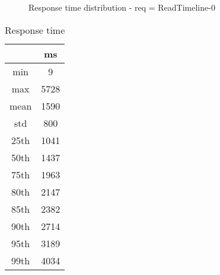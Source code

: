 \begin{minipage}{0.75\linewidth}
\begin{figure}[h]
\begin{adjustbox}{max width=1.0\linewidth, keepaspectratio}
  \end{adjustbox}
  \caption{Response time distribution - req = ReadTimeline-0}
\end{figure}
\end{minipage}\hfill\begin{minipage}{0.18\linewidth}
\begin{table}[h]
\begin{tabular}{|cc|}
\hline
\textbf{} & \textbf{ms}\\ \hline
 \Xhline{0.005\arrayrulewidth}
min & 9\\
 \Xhline{0.005\arrayrulewidth}
max & 5728\\
 \Xhline{0.005\arrayrulewidth}
mean & 1590\\
 \Xhline{0.005\arrayrulewidth}
std & 800\\
\hline
\hline
 \Xhline{0.005\arrayrulewidth}
25th & 1041\\
 \Xhline{0.005\arrayrulewidth}
50th & 1437\\
 \Xhline{0.005\arrayrulewidth}
75th & 1963\\
 \Xhline{0.005\arrayrulewidth}
80th & 2147\\
 \Xhline{0.005\arrayrulewidth}
85th & 2382\\
 \Xhline{0.005\arrayrulewidth}
90th & 2714\\
 \Xhline{0.005\arrayrulewidth}
95th & 3189\\
 \Xhline{0.005\arrayrulewidth}
99th & 4034\\
\hline
\end{tabular}
\caption{Response time}
\end{table}
\end{minipage}\hfill